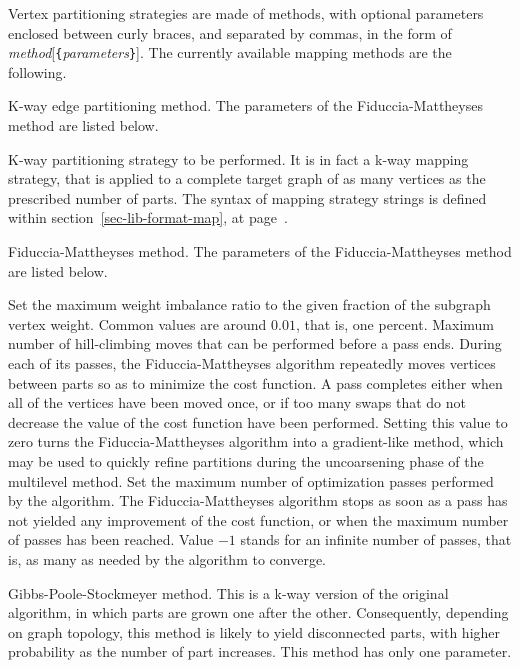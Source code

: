 Vertex partitioning strategies are made of methods, with optional
parameters enclosed between curly braces, and separated by commas, in
the form of {\it method\/}{[{\tt \{}{\it parameters\/}{\tt \}}]}\enspace.
The currently available mapping methods are the following.

\begin{itemize}
\iteme[{\tt e}]
K-way edge partitioning method. The parameters of the Fiduccia-Mattheyses method
are listed below.
\begin{itemize}
\iteme[{\tt strat=}{\it strat}]
K-way partitioning strategy to be performed. It is in fact a k-way
mapping strategy, that is applied to a complete target graph of as
many vertices as the prescribed number of parts. The syntax of mapping
strategy strings is defined within section~\ref{sec-lib-format-map},
at page~\pageref{sec-lib-format-map}.
\end{itemize}
\iteme[{\tt f}]
Fiduccia-Mattheyses method. The parameters of the Fiduccia-Mattheyses method
are listed below.
\begin{itemize}
\iteme[{\tt bal=}{\it rat}]
Set the maximum weight imbalance ratio to the given fraction of
the subgraph vertex weight. Common values are around $0.01$, that
is, one percent.
\iteme[{\tt move=}{\it nbr}]
Maximum number of hill-climbing moves that can be performed before a
pass ends. During each of its passes, the Fiduccia-Mattheyses
algorithm repeatedly moves vertices between parts so as to
minimize the cost function. A pass completes either when all of the
vertices have been moved once, or if too many swaps that do not
decrease the value of the cost function have been performed. Setting
this value to zero turns the Fiduccia-Mattheyses algorithm into a
gradient-like method, which may be used to quickly refine partitions
during the uncoarsening phase of the multilevel method.
\iteme[{\tt pass=}{\it nbr}]
Set the maximum number of optimization passes performed by the
algorithm. The Fiduccia-Mattheyses algorithm stops as soon as a pass
has not yielded any improvement of the cost function, or when the
maximum number of passes has been reached. Value $-1$ stands for an
infinite number of passes, that is, as many as needed by the algorithm
to converge.
\end{itemize}
\iteme[{\tt g}]
Gibbs-Poole-Stockmeyer method. This is a k-way version of the
original algorithm, in which parts are grown one after the
other. Consequently, depending on graph topology, this method is
likely to yield disconnected parts, with higher probability as the
number of part increases. This method has only one parameter.

\end{itemize}
